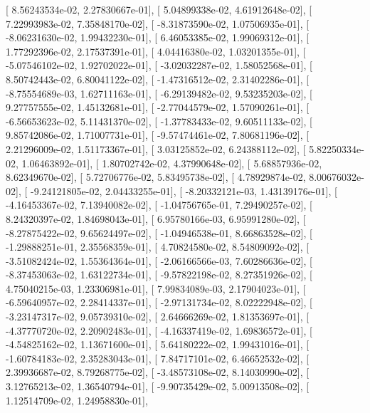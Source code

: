 \documentclass{article}
\begin{document}
       [  8.56243534e-02,   2.27830667e-01],
       [  5.04899338e-02,   4.61912648e-02],
       [  7.22993983e-02,   7.35848170e-02],
       [ -8.31873590e-02,   1.07506935e-01],
       [ -8.06231630e-02,   1.99432230e-01],
       [  6.46053385e-02,   1.99069312e-01],
       [  1.77292396e-02,   2.17537391e-01],
       [  4.04416380e-02,   1.03201355e-01],
       [ -5.07546102e-02,   1.92702022e-01],
       [ -3.02032287e-02,   1.58052568e-01],
       [  8.50742443e-02,   6.80041122e-02],
       [ -1.47316512e-02,   2.31402286e-01],
       [ -8.75554689e-03,   1.62711163e-01],
       [ -6.29139482e-02,   9.53235203e-02],
       [  9.27757555e-02,   1.45132681e-01],
       [ -2.77044579e-02,   1.57090261e-01],
       [ -6.56653623e-02,   5.11431370e-02],
       [ -1.37783433e-02,   9.60511133e-02],
       [  9.85742086e-02,   1.71007731e-01],
       [ -9.57474461e-02,   7.80681196e-02],
       [  2.21296009e-02,   1.51173367e-01],
       [  3.03125852e-02,   6.24388112e-02],
       [  5.82250334e-02,   1.06463892e-01],
       [  1.80702742e-02,   4.37990648e-02],
       [  5.68857936e-02,   8.62349670e-02],
       [  5.72706776e-02,   5.83495738e-02],
       [  4.78929874e-02,   8.00676032e-02],
       [ -9.24121805e-02,   2.04433255e-01],
       [ -8.20332121e-03,   1.43139176e-01],
       [ -4.16453367e-02,   7.13940082e-02],
       [ -1.04756765e-01,   7.29490257e-02],
       [  8.24320397e-02,   1.84698043e-01],
       [  6.95780166e-03,   6.95991280e-02],
       [ -8.27875422e-02,   9.65624497e-02],
       [ -1.04946538e-01,   8.66863528e-02],
       [ -1.29888251e-01,   2.35568359e-01],
       [  4.70824580e-02,   8.54809092e-02],
       [ -3.51082424e-02,   1.55364364e-01],
       [ -2.06166566e-03,   7.60286636e-02],
       [ -8.37453063e-02,   1.63122734e-01],
       [ -9.57822198e-02,   8.27351926e-02],
       [  4.75040215e-03,   1.23306981e-01],
       [  7.99834089e-03,   2.17904023e-01],
       [ -6.59640957e-02,   2.28414337e-01],
       [ -2.97131734e-02,   8.02222948e-02],
       [ -3.23147317e-02,   9.05739310e-02],
       [  2.64666269e-02,   1.81353697e-01],
       [ -4.37770720e-02,   2.20902483e-01],
       [ -4.16337419e-02,   1.69836572e-01],
       [ -4.54825162e-02,   1.13671600e-01],
       [  5.64180222e-02,   1.99431016e-01],
       [ -1.60784183e-02,   2.35283043e-01],
       [  7.84717101e-02,   6.46652532e-02],
       [  2.39936687e-02,   8.79268775e-02],
       [ -3.48573108e-02,   8.14030990e-02],
       [  3.12765213e-02,   1.36540794e-01],
       [ -9.90735429e-02,   5.00913508e-02],
       [  1.12514709e-02,   1.24958830e-01],
\end{document}
